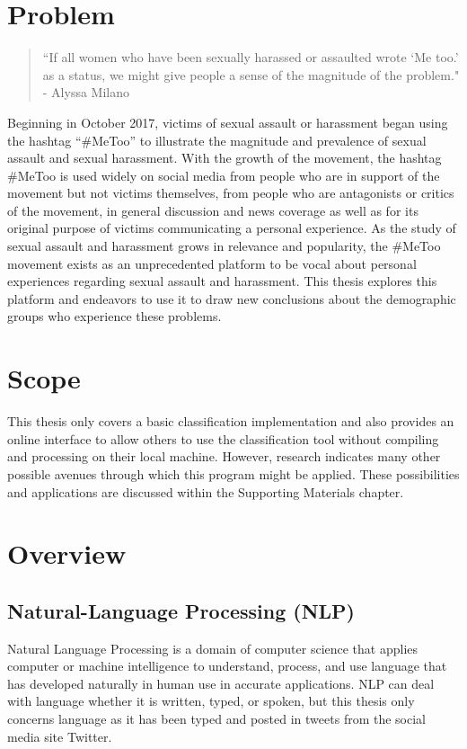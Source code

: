 \section{Problem}

\begin{quote}
``If all women who have been sexually harassed or assaulted wrote `Me too.' as a status, we might give people a sense of the magnitude of the problem." - Alyssa Milano
\end{quote}

Beginning in October 2017, victims of sexual assault or harassment began using the hashtag “\#MeToo” to illustrate the magnitude and prevalence of sexual assault and sexual harassment. With the growth of the movement, the hashtag \#MeToo is used widely on social media from people who are in support of the movement but not victims themselves, from people who are antagonists or critics of the movement, in general discussion and news coverage as well as for its original purpose of victims communicating a personal experience. As the study of sexual assault and harassment grows in relevance and popularity, the \#MeToo movement exists as an unprecedented platform to be vocal about personal experiences regarding sexual assault and harassment. This thesis explores this platform and endeavors to use it to draw new conclusions about the demographic groups who experience these problems.

\section{Scope}

This thesis only covers a basic classification implementation and also provides an online interface to allow others to use the classification tool without compiling and processing on their local machine. However, research indicates many other possible avenues through which this program might be applied. These possibilities and applications are discussed within the Supporting Materials chapter.

\section{Overview}

\subsection{Natural-Language Processing (NLP)}

Natural Language Processing is a domain of computer science that applies computer or machine intelligence to understand, process, and use language that has developed naturally in human use in accurate applications. NLP can deal with language whether it is written, typed, or spoken, but this thesis only concerns language as it has been typed and posted in tweets from the social media site Twitter.

